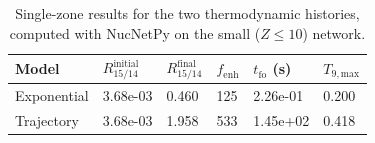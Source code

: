 \begin{table}[h!]
\centering
\caption{Single-zone results for the two thermodynamic histories, computed with NucNetPy on the small ($Z\leq10$) network.}
\begin{tabular}{llllll}
\hline
Model & $R^{\mathrm{initial}}_{15/14}$ & $R^{\mathrm{final}}_{15/14}$ & $f_{\mathrm{enh}}$ & $t_{\mathrm{fo}}$ (s) & $T_{9,\mathrm{max}}$ \\
\hline
Exponential & 3.68e-03 & 0.460 & 125 & 2.26e-01 & 0.200 \\
Trajectory & 3.68e-03 & 1.958 & 533 & 1.45e+02 & 0.418 \\
\hline
\end{tabular}
\label{tab:nucnetpy_comparison}
\end{table}

